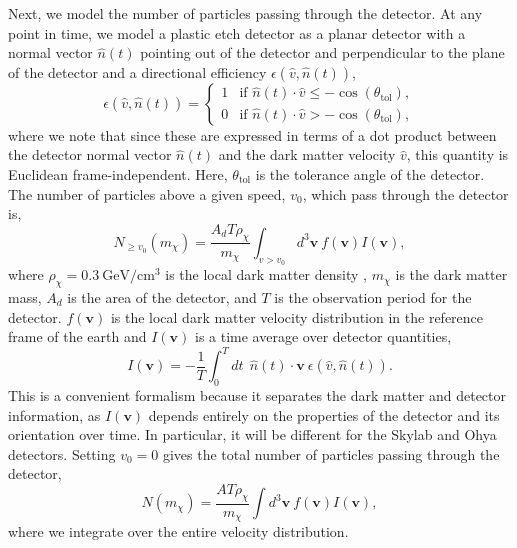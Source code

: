 \documentclass[12pt]{article}
\begin{document}
Next, we model the number of particles passing through the detector.
At any point in time, we model a plastic etch detector as a planar detector with a normal vector $\hat{n}(t)$ pointing out of the detector and perpendicular to the plane of the detector and a directional efficiency $ \epsilon(\hat{v},\hat{n}(t))$,
\begin{equation} \label{eq:EffFac}
   \epsilon(\hat{v},\hat{n}(t)) = \begin{cases}
1 & \text{if } \hat{n}(t) \cdot \hat{v}\leq-\cos(\theta_{\mathrm{tol}}), \\
0 & \text{if } \hat{n}(t) \cdot \hat{v} >-\cos(\theta_{\mathrm{tol}}),
\end{cases}
\end{equation}
where we note that since these are expressed in terms of a dot product between the detector normal vector $\hat{n}(t)$ and the dark matter velocity $\hat{v}$, this quantity is Euclidean frame-independent. Here, $\theta_{\mathrm{tol}}$ is the tolerance angle of the detector. 
The number of particles above a given speed, $v_0$, which pass through the detector is,
\begin{equation}\label{eq:speedFlux}
    N_{\geq v_0}(m_{\chi})= \frac{A_dT\rho_{\chi}}{m_{\chi}} \int_{v>v_0} d^3\mathbf{v} \  f(\mathbf{v}) I(\mathbf{v}),
\end{equation}
where $\rho_{\chi}=0.3\ \mathrm{ GeV}/\mathrm{cm}^3$ is the local dark matter density \cite{Eilers_2019dmspeed}, $m_{\chi}$ is the dark matter mass, $A_d$ is the area of the detector, and $T$ is the observation period for the detector. $f(\mathbf{v})$ is the local dark matter velocity distribution in the reference frame of the earth and $I(\mathbf{v})$ is a time average over detector quantities,
\begin{equation}
    I(\mathbf{v})=-\frac{1}{T}\int_0^{T} dt \ \ \hat{n}(t) \cdot \mathbf{v}\ \epsilon( \hat{v},\hat{n}(t) ) .
\end{equation}
This is a convenient formalism because it separates the dark matter and detector information, as $I(\mathbf{v})$ depends entirely on the properties of the detector and its orientation over time. 
In particular, it will be different for the Skylab and Ohya detectors. Setting $v_0=0$ gives the total number of particles passing through the detector,
\begin{equation}\label{eq:totalFlux}
    N (m_{\chi})= \frac{AT\rho_{\chi}}{m_{\chi}} \int d^3\mathbf{v} \  f(\mathbf{v}) I(\mathbf{v}),
\end{equation}
where we integrate over the entire velocity distribution.
\end{document}
